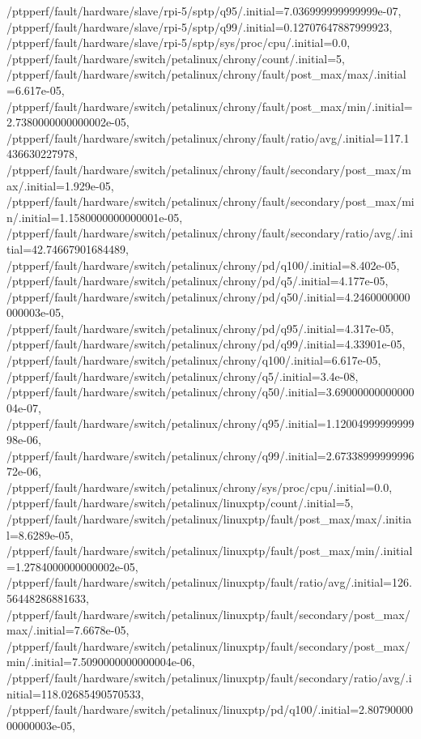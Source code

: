 {    /ptpperf/fault/hardware/slave/rpi-5/sptp/q95/.initial=7.036999999999999e-07,
    /ptpperf/fault/hardware/slave/rpi-5/sptp/q99/.initial=0.12707647887999923,
    /ptpperf/fault/hardware/slave/rpi-5/sptp/sys/proc/cpu/.initial=0.0,
    /ptpperf/fault/hardware/switch/petalinux/chrony/count/.initial=5,
    /ptpperf/fault/hardware/switch/petalinux/chrony/fault/post_max/max/.initial=6.617e-05,
    /ptpperf/fault/hardware/switch/petalinux/chrony/fault/post_max/min/.initial=2.7380000000000002e-05,
    /ptpperf/fault/hardware/switch/petalinux/chrony/fault/ratio/avg/.initial=117.1436630227978,
    /ptpperf/fault/hardware/switch/petalinux/chrony/fault/secondary/post_max/max/.initial=1.929e-05,
    /ptpperf/fault/hardware/switch/petalinux/chrony/fault/secondary/post_max/min/.initial=1.1580000000000001e-05,
    /ptpperf/fault/hardware/switch/petalinux/chrony/fault/secondary/ratio/avg/.initial=42.74667901684489,
    /ptpperf/fault/hardware/switch/petalinux/chrony/pd/q100/.initial=8.402e-05,
    /ptpperf/fault/hardware/switch/petalinux/chrony/pd/q5/.initial=4.177e-05,
    /ptpperf/fault/hardware/switch/petalinux/chrony/pd/q50/.initial=4.2460000000000003e-05,
    /ptpperf/fault/hardware/switch/petalinux/chrony/pd/q95/.initial=4.317e-05,
    /ptpperf/fault/hardware/switch/petalinux/chrony/pd/q99/.initial=4.33901e-05,
    /ptpperf/fault/hardware/switch/petalinux/chrony/q100/.initial=6.617e-05,
    /ptpperf/fault/hardware/switch/petalinux/chrony/q5/.initial=3.4e-08,
    /ptpperf/fault/hardware/switch/petalinux/chrony/q50/.initial=3.6900000000000004e-07,
    /ptpperf/fault/hardware/switch/petalinux/chrony/q95/.initial=1.1200499999999998e-06,
    /ptpperf/fault/hardware/switch/petalinux/chrony/q99/.initial=2.6733899999999672e-06,
    /ptpperf/fault/hardware/switch/petalinux/chrony/sys/proc/cpu/.initial=0.0,
    /ptpperf/fault/hardware/switch/petalinux/linuxptp/count/.initial=5,
    /ptpperf/fault/hardware/switch/petalinux/linuxptp/fault/post_max/max/.initial=8.6289e-05,
    /ptpperf/fault/hardware/switch/petalinux/linuxptp/fault/post_max/min/.initial=1.2784000000000002e-05,
    /ptpperf/fault/hardware/switch/petalinux/linuxptp/fault/ratio/avg/.initial=126.56448286881633,
    /ptpperf/fault/hardware/switch/petalinux/linuxptp/fault/secondary/post_max/max/.initial=7.6678e-05,
    /ptpperf/fault/hardware/switch/petalinux/linuxptp/fault/secondary/post_max/min/.initial=7.5090000000000004e-06,
    /ptpperf/fault/hardware/switch/petalinux/linuxptp/fault/secondary/ratio/avg/.initial=118.02685490570533,
    /ptpperf/fault/hardware/switch/petalinux/linuxptp/pd/q100/.initial=2.8079000000000003e-05,
}
